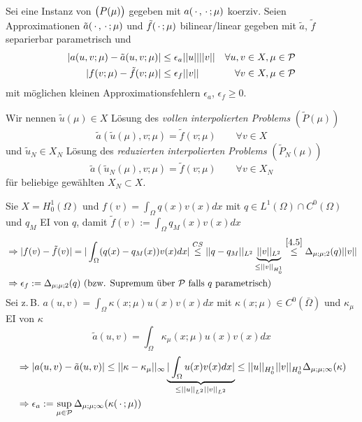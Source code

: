 \begin{defn} \label{4.8}
Sei eine Instanz von $\big(P(\mu)\big)$ gegeben mit $a(\,\cdot\,,\,\cdot\,;\mu)$ koerziv. Seien Approximationen $\tilde{a}(\,\cdot\,,\,\cdot\,;\mu)$ und $\tilde{f}(\,\cdot\,;\mu)$ bilinear/linear gegeben mit $\tilde{a}$, $\tilde{f}$ separierbar parametrisch und
\begin{align*}
	| a(u,v;\mu) - \tilde{a}(u,v;\mu) | &\leq \epsilon_a ||u|| ||v|| &\forall u,v \in X, \mu \in \mathcal{P} \\
	|f(v;\mu) - \tilde{f}(v;\mu) | &\leq \epsilon_f ||v|| &\forall v \in X, \mu \in \mathcal{P}
\end{align*} 
mit möglichen kleinen Approximationsfehlern $\epsilon_a$, $\epsilon_f \geq 0$.

Wir nennen $\tilde{u}(\mu) \in X$ Lösung des \emph{vollen interpolierten Problems} $(\tilde{P}(\mu))$
\[
	\tilde{a}(\tilde{u}(\mu),v;\mu) = \tilde{f}(v;\mu)	\qquad \forall v \in X
\]
und $\tilde{u}_N \in X_N$ Lösung des \emph{reduzierten interpolierten Problems} $(\tilde{P}_N(\mu))$
\[
	\tilde{a}(\tilde{u}_N(\mu),v;\mu) = \tilde{f}(v;\mu)	\qquad \forall v \in X_N
\]
für beliebige gewählten $X_N \subset X$.
\end{defn}

\begin{bem}
Sie $X=H_0^1(\Omega)$ und $f(v) = \int_{\Omega} q(x) v(x) dx$ mit $q \in L^1(\Omega) \cap C^0(\Omega)$ und $q_M$ EI von $q$, damit $\tilde{f}(v) := \int_{\Omega} q_M(x)v(x) dx$
\begin{align*}
& \Rightarrow |f(v) - \tilde{f}(v)| = | \int_{\Omega} (q(x) - q_M(x)) v(x) dx | \overset{CS}{\leq} || q - q_M||_{L^2} \underbrace{||v||_{L^2}}_{\leq ||v||_{H_0^1}} \overset{\ref{4.5}}{\leq} \Delta_{\mu;\mu;2} (q) ||v|| \\
& \Rightarrow \epsilon_f := \Delta_{\mu;\mu;2} (q) \text{ (bzw. Supremum über } \mathcal{P} \text{ falls } q \text{ parametrisch)}
\end{align*}
Sei z.\,B. $a(u,v) = \int_{\Omega} \kappa(x;\mu) u(x) v(x) dx$ mit $\kappa(x;\mu) \in C^0(\bar{\Omega})$ und $\kappa_{\mu}$ EI von $\kappa$
\[
	\tilde{a}(u,v) = \int_{\Omega} \kappa_{\mu} (x;\mu) u(x) v(x) dx
\]
\begin{align*}
	& \Rightarrow |a(u,v) - \tilde{a}(u,v) | \leq || \kappa - \kappa_{\mu}||_{\infty} \underbrace{|\int_{\Omega} u(x) v(x) dx|}_{\leq ||u||_{L^2} ||v||_{L^2}} \leq || u||_{H_0^1} ||v||_{H_0^1} \Delta_{\mu;\mu;\infty} (\kappa) \\
	& \Rightarrow \epsilon_a := \sup\limits_{\mu \in \mathcal{P}} \Delta_{\mu;\mu;\infty} (\kappa(\,\cdot\,;\mu))
\end{align*}
\end{bem}

